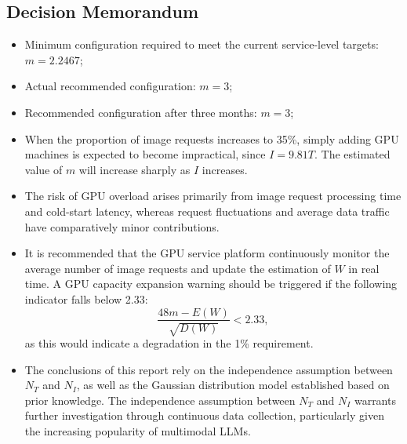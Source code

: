 \documentclass[10pt,a4paper]{article}
\begin{document}
	\subsection{Decision Memorandum}
	\begin{itemize}
		\item Minimum configuration required to meet the current service-level targets: $m=2.2467$;
		
		\item Actual recommended configuration: $m=3$;
		
		\item Recommended configuration after three months: $m=3$;
		
		\item When the proportion of image requests increases to 35\%, simply adding GPU machines is expected to become impractical, since $I=9.81T$. The estimated value of $m$ will increase sharply as $I$ increases.
		
		\item The risk of GPU overload arises primarily from image request processing time and cold-start latency, whereas request fluctuations and average data traffic have comparatively minor contributions.
		
		\item It is recommended that the GPU service platform continuously monitor the average number of image requests and update the estimation of $W$ in real time. A GPU capacity expansion warning should be triggered if the following indicator falls below 2.33:
		\[
		\frac{48m-E(W)}{\sqrt{D(W)}} < 2.33,
		\]
		as this would indicate a degradation in the 1\% requirement.
		
		\item The conclusions of this report rely on the independence assumption between $N_T$ and $N_I$, as well as the Gaussian distribution model established based on prior knowledge. The independence assumption between $N_T$ and $N_I$ warrants further investigation through continuous data collection, particularly given the increasing popularity of multimodal LLMs.	
	\end{itemize}
\end{document}
